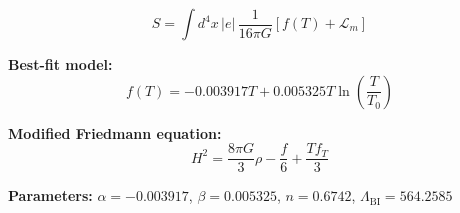 
\begin{equation}
  S = \int d^4x \, |e| \, \frac{1}{16\pi G} \left[ f(T) + \mathcal{L}_m \right]
\end{equation}

\textbf{Best-fit model:}
\begin{equation}
  f(T) = -0.003917 T + 0.005325 T \ln\!\left(\frac{T}{T_0}\right)
\end{equation}

\textbf{Modified Friedmann equation:}
\begin{equation}
  H^2 = \frac{8\pi G}{3} \rho - \frac{f}{6} + \frac{T f_T}{3}
\end{equation}

\textbf{Parameters:}
$\alpha = -0.003917$, \quad
$\beta = 0.005325$, \quad
$n = 0.6742$, \quad
$\Lambda_{\text{BI}} = 564.2585$